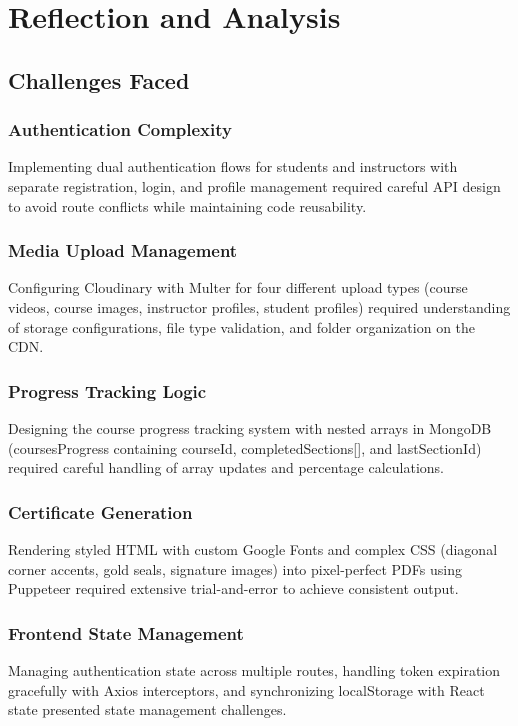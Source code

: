 \documentclass[12pt,a4paper]{report}
\begin{document}
\chapter{Reflection and Analysis}

\section{Challenges Faced}

\subsection{Authentication Complexity}
Implementing dual authentication flows for students and instructors with separate registration, login, and profile management required careful API design to avoid route conflicts while maintaining code reusability.

\subsection{Media Upload Management}
Configuring Cloudinary with Multer for four different upload types (course videos, course images, instructor profiles, student profiles) required understanding of storage configurations, file type validation, and folder organization on the CDN.

\subsection{Progress Tracking Logic}
Designing the course progress tracking system with nested arrays in MongoDB (coursesProgress containing courseId, completedSections[], and lastSectionId) required careful handling of array updates and percentage calculations.

\subsection{Certificate Generation}
Rendering styled HTML with custom Google Fonts and complex CSS (diagonal corner accents, gold seals, signature images) into pixel-perfect PDFs using Puppeteer required extensive trial-and-error to achieve consistent output.

\subsection{Frontend State Management}
Managing authentication state across multiple routes, handling token expiration gracefully with Axios interceptors, and synchronizing localStorage with React state presented state management challenges.
\end{document}
